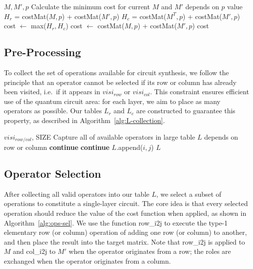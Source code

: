 \begin{algorithm}[htbp]
\caption{functionCost}
\label{alg:functionCost}
\begin{algorithmic}[1]
\Require $M, M', p$
\Ensure Calculate the minimum cost for current $M$ and $M'$ depends on $p$ value
	\State $H_{r}$ = costMat($M, p$) + costMat($M', p$)
	\State $H_{c}$ = costMat($M^{T}, p$) + costMat($M', p$)
	\State cost $\leftarrow$ max($H_{r}, H_{c}$)
\Else
	\State cost $\leftarrow$ costMat($M, p$) + costMat($M', p$)
\EndIf
\State \Return cost
\end{algorithmic}
\end{algorithm}

\subsection{Pre-Processing}

To collect the set of operations available for circuit synthesis, we follow the principle that an operator cannot be selected if its row or column has already been visited, i.e.\ if it appears in $visi_{row}$ or $visi_{col}$. This constraint ensures efficient use of the quantum circuit area: for each layer, we aim to place as many operators as possible. Our tables $L_r$ and $L_c$ are constructed to guarantee this property, as described in Algorithm~\ref{alg:L-collection}.

\begin{algorithm}[htbp]
\caption{L\_Collection}
\label{alg:L-collection}
\begin{algorithmic}[1]
\Require $visi_{row/col}$, SIZE
\Ensure Capture all of available operators in large table $L$ depends on row or column
			\State \textbf{continue}
				\State \textbf{continue}
			\EndIf
			\State $L$.append($i, j$)
		\EndFor
		\EndIf
	\EndFor
\State \Return $L$
\end{algorithmic}
\end{algorithm}

\subsection{Operator Selection}

After collecting all valid operators into our table $L$, we select a subset of operations to constitute a single-layer circuit. The core idea is that every selected operation should reduce the value of the cost function when applied, as shown in Algorithm~\ref{alg:ops-sel}. We use the function row\_i2j to execute the type-1 elementary row (or column) operation of adding one row (or column) to another, and then place the result into the target matrix. Note that row\_i2j is applied to $M$ and col\_i2j to $M'$ when the operator originates from a row; the roles are exchanged when the operator originates from a column.

